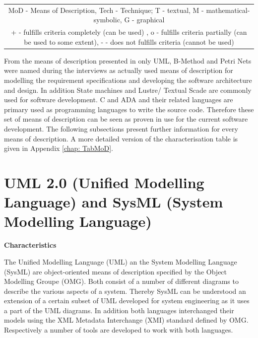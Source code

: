 \documentclass{./template/openetcs_report}
\begin{document}
\begin{center}
\begin{landscape}
\begin{table}[htp]
\begin{tabular}{|m{6cm}|m{0.8cm}|m{0.5cm}|m{0.8cm}|m{0.8cm}|m{0.8cm}|m{0.8cm}|m{0.8cm}|m{0.8cm}|m{0.5cm}||m{0.8cm}|m{1.5cm}|m{1.5cm}|m{2cm}|}
\multicolumn{14}{|c|}{MoD - Means of Description, Tech - Technique; T - textual, M - mathematical-symbolic, G - graphical} \\
\multicolumn{14}{|c|}{+ - fulfills criteria completely  (can be used) , o - fulfills criteria partially (can be used to some extent), - - does not fulfills criteria (cannot be used)} \\ \hline

\end{tabular}
\end{table}

   \end{landscape}
\end{center}


From the means of description presented in  \citeauthor{EN50128:2011}  only UML, B-Method and Petri Nets were named during the interviews as actually used means of description for modelling the requirement specifications and developing the software architecture and design. In addition State machines and Lustre/ Textual Scade are commonly used for software development. C and ADA and their related languages are primary used as programming languages to write the source code. Therefore these set of means of description can be seen as proven in use for the current software development. The following subsections present further information for every means of description. A more detailed version of the characterisation table is given in Appendix \ref{chap: TabMoD}.

\section{UML 2.0 (Unified Modelling Language) and SysML (System Modelling Language)}


	\textbf{Characteristics}

	The Unified Modelling Language (UML) an the System Modelling Language (SysML) are object-oriented means of description specified by the Object Modelling Groupe (OMG). Both consist of a number of different diagrams to describe the various aspects of a system. Thereby SysML can be understood an extension of a certain subset of UML developed for system engineering as it uses a part of the UML diagrams. In addition both languages interchanged their models using the XML Metadata Interchange (XMI) standard defined by OMG. Respectively a number of tools are developed to work with both languages.
\end{document}
